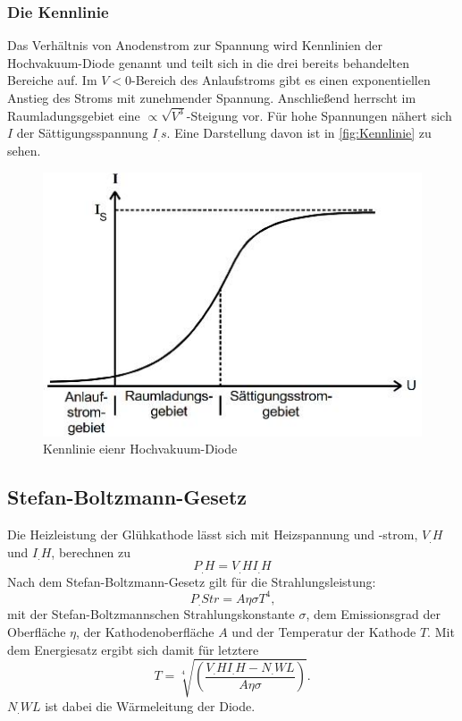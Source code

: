 \subsubsection{Die Kennlinie}
Das Verhältnis von Anodenstrom zur Spannung wird Kennlinien der Hochvakuum-Diode genannt und teilt sich in die drei bereits behandelten Bereiche auf.
Im $V<0$-Bereich des Anlaufstroms gibt es einen exponentiellen Anstieg des Stroms mit zunehmender Spannung. Anschließend herrscht im Raumladungsgebiet eine $\propto \sqrt{V^3}$-Steigung vor. Für hohe Spannungen nähert sich $I$ der Sättigungsspannung $I_.s$. Eine Darstellung davon ist in \ref{fig:Kennlinie} zu sehen.

\begin{figure}
\centering
\includegraphics[width=\linewidth-70pt,height=\textheight-70pt,keepaspectratio]{content/images/Kennlinie.jpg}
\caption{Kennlinie eienr Hochvakuum-Diode\cite{V504}}
\label{fig:HVD}
\end{figure}

\subsection{Stefan-Boltzmann-Gesetz}
Die Heizleistung der Glühkathode lässt sich mit Heizspannung und -strom, $V_.H$ und $I_.H$, berechnen zu
\begin{equation*}
P_.H=V_.HI_.H
\end{equation*}
Nach dem Stefan-Boltzmann-Gesetz gilt für die Strahlungsleistung:
\begin{equation*}
P_.{Str}= A\eta\sigma T^4\text{,}
\end{equation*}
mit der Stefan-Boltzmannschen Strahlungskonstante $\sigma$, dem Emissionsgrad der Oberfläche $\eta$, der Kathodenoberfläche $A$ und der Temperatur der Kathode $T$.
Mit dem Energiesatz ergibt sich damit für letztere
\begin{equation}
T=\sqrt[4]{\left(\frac{V_.HI_.H-N_.{WL}}{A\eta\sigma}\right)}\text{.}\label{eq:T}
\end{equation}
$N_.WL$ ist dabei die Wärmeleitung der Diode.